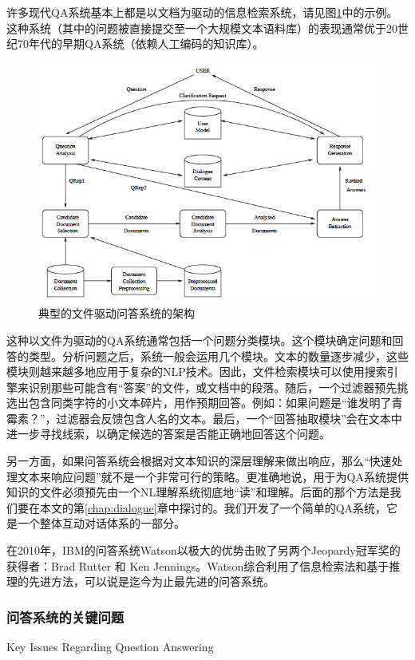 许多现代QA系统基本上都是以文档为驱动的信息检索系统，请见图\ref{fig:qa}中的示例\cite{Hirschman2001}。这种系统（其中的问题被直接提交至一个大规模文本语料库）的表现通常优于20世纪70年代的早期QA系统（依赖人工编码的知识库）。

\begin{figure}[htb]
\centering
\includegraphics[width=12cm]{figures/qa.png}
\caption{典型的文件驱动问答系统的架构}
\label{fig:qa}
\end{figure}

这种以文件为驱动的QA系统通常包括一个问题分类模块。这个模块确定问题和回答的类型。分析问题之后，系统一般会运用几个模块。文本的数量逐步减少，这些模块则越来越多地应用于复杂的NLP技术。因此，文件检索模块可以使用搜索引擎来识别那些可能含有“答案”的文件，或文档中的段落。随后，一个过滤器预先挑选出包含同类字符的小文本碎片，用作预期回答。例如：如果问题是“谁发明了青霉素？”，过滤器会反馈包含人名的文本。最后，一个“回答抽取模块”会在文本中进一步寻找线索，以确定候选的答案是否能正确地回答这个问题。

另一方面，如果问答系统会根据对文本知识的深层理解来做出响应，那么“快速处理文本来响应问题”就不是一个非常可行的策略。更准确地说，用于为QA系统提供知识的文件必须预先由一个NL理解系统彻底地“读”和理解。后面的那个方法是我们要在本文的第\ref{chap:dialogue}章中探讨的。我们开发了一个简单的QA系统，它是一个整体互动对话体系的一部分。

在2010年，IBM的问答系统Watson以极大的优势击败了另两个Jeopardy冠军奖的获得者：Brad Rutter 和 Ken Jennings。Watson综合利用了信息检索法和基于推理的先进方法\cite{Ferrucci2011}，可以说是迄今为止最先进的问答系统。

\subsubsection{问答系统的关键问题}{Key Issues Regarding Question Answering}

